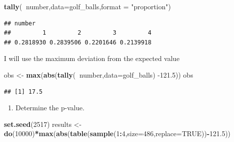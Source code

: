 \documentclass[
]{book}
\newenvironment{Shaded}{\begin{snugshade}}{\end{snugshade}}
\newcommand{\DataTypeTok}[1]{\textcolor[rgb]{0.13,0.29,0.53}{#1}}
\newcommand{\DecValTok}[1]{\textcolor[rgb]{0.00,0.00,0.81}{#1}}
\newcommand{\FloatTok}[1]{\textcolor[rgb]{0.00,0.00,0.81}{#1}}
\newcommand{\KeywordTok}[1]{\textcolor[rgb]{0.13,0.29,0.53}{\textbf{#1}}}
\newcommand{\NormalTok}[1]{#1}
\newcommand{\OperatorTok}[1]{\textcolor[rgb]{0.81,0.36,0.00}{\textbf{#1}}}
\newcommand{\OtherTok}[1]{\textcolor[rgb]{0.56,0.35,0.01}{#1}}
\newcommand{\StringTok}[1]{\textcolor[rgb]{0.31,0.60,0.02}{#1}}
\providecommand{\tightlist}{%
  \setlength{\itemsep}{0pt}\setlength{\parskip}{0pt}}
\begin{document}
\begin{Shaded}
\begin{Highlighting}[]
\KeywordTok{tally}\NormalTok{(}\OperatorTok{~}\NormalTok{number,}\DataTypeTok{data=}\NormalTok{golf_balls,}\DataTypeTok{format =} \StringTok{"proportion"}\NormalTok{)}
\end{Highlighting}
\end{Shaded}

\begin{verbatim}
## number
##         1         2         3         4 
## 0.2818930 0.2839506 0.2201646 0.2139918
\end{verbatim}

I will use the maximum deviation from the expected value

\begin{Shaded}
\begin{Highlighting}[]
\NormalTok{obs <-}\StringTok{ }\KeywordTok{max}\NormalTok{(}\KeywordTok{abs}\NormalTok{(}\KeywordTok{tally}\NormalTok{(}\OperatorTok{~}\NormalTok{number,}\DataTypeTok{data=}\NormalTok{golf_balls) }\FloatTok{-121.5}\NormalTok{))}
\NormalTok{obs}
\end{Highlighting}
\end{Shaded}

\begin{verbatim}
## [1] 17.5
\end{verbatim}

\begin{enumerate}
\def\labelenumi{\alph{enumi}.}
\setcounter{enumi}{2}
\tightlist
\item
  Determine the p-value.
\end{enumerate}

\begin{Shaded}
\begin{Highlighting}[]
\KeywordTok{set.seed}\NormalTok{(}\DecValTok{2517}\NormalTok{)}
\NormalTok{results <-}\StringTok{ }\KeywordTok{do}\NormalTok{(}\DecValTok{10000}\NormalTok{)}\OperatorTok{*}\KeywordTok{max}\NormalTok{(}\KeywordTok{abs}\NormalTok{(}\KeywordTok{table}\NormalTok{(}\KeywordTok{sample}\NormalTok{(}\DecValTok{1}\OperatorTok{:}\DecValTok{4}\NormalTok{,}\DataTypeTok{size=}\DecValTok{486}\NormalTok{,}\DataTypeTok{replace=}\OtherTok{TRUE}\NormalTok{))}\OperatorTok{-}\FloatTok{121.5}\NormalTok{))}
\end{Highlighting}
\end{Shaded}
\end{document}
